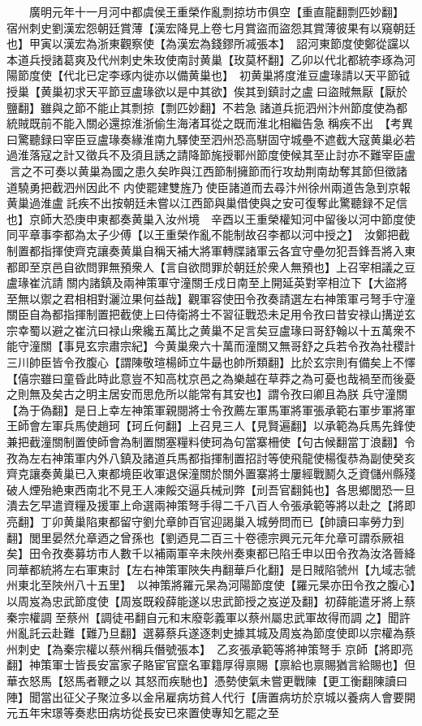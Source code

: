 　　廣明元年十一月河中都虞侯王重榮作亂剽掠坊市俱空【重直龍翻剽匹妙翻】　宿州刺史劉漢宏怨朝廷賞薄【漢宏降見上卷七月賞盜而盜怨其賞薄彼果有以窺朝廷也】甲寅以漢宏為浙東觀察使【為漢宏為錢鏐所㓕張本】　詔河東節度使鄭從讜以本道兵授諸葛爽及代州刺史朱玫使南討黄巢【玫莫杯翻】乙卯以代北都統李琢為河陽節度使【代北已定李琢内徙亦以備黄巢也】　初黄巢將度淮豆盧瑑請以天平節钺授巢【黄巢初求天平節豆盧瑑欲以是中其欲】俟其到鎮討之盧曰盜賊無厭【厭於鹽翻】雖與之節不能止其剽掠【剽匹妙翻】不若急諸道兵扼泗州汴州節度使為都統賊既前不能入關必還掠淮浙偷生海渚耳從之既而淮北相繼告急稱疾不出　【考異曰驚聽録曰宰臣豆盧瑑奏緣淮南九驛使至泗州恐高駢固守城壘不遮截大寇黄巢必若過淮落寇之計又徵兵不及須且誘之請降節旄授鄆州節度使候其至止討亦不難宰臣盧言之不可奏以黄巢為國之患久矣昨與江西節制擁節而行攻劫荆南劫奪其節但徵諸道驍勇把截泗州因此不内使罷建雙旌乃使臣諸道而去尋汴州徐州兩道告急到京報黄巢過淮盧託疾不出按朝廷未嘗以江西節與巢借使與之安可復奪此驚聽録不足信也】京師大恐庚申東都奏黄巢入汝州境　辛酉以王重榮權知河中留後以河中節度使同平章事李都為太子少傅【以王重榮作亂不能制故召李都以河中授之】　汝鄭把截制置都指揮使齊克讓奏黄巢自稱天補大將軍轉牒諸軍云各宜守壘勿犯吾鋒吾將入東都即至京邑自欲問罪無預衆人【言自欲問罪於朝廷於衆人無預也】上召宰相議之豆盧瑑崔沆請關内諸鎮及兩神策軍守潼關壬戍日南至上開延英對宰相泣下【大盜將至無以禦之君相相對灑泣果何益哉】觀軍容使田令孜奏請選左右神策軍弓弩手守潼關臣自為都指揮制置把截使上曰侍衛將士不習征戰恐未足用令孜曰昔安禄山搆逆玄宗幸蜀以避之崔沆曰禄山衆纔五萬比之黄巢不足言矣豆盧瑑曰哥舒翰以十五萬衆不能守潼關【事見玄宗肅宗紀】今黄巢衆六十萬而潼關又無哥舒之兵若令孜為社稷計三川帥臣皆令孜腹心【謂陳敬瑄楊師立牛朂也帥所類翻】比於玄宗則有備矣上不懌【僖宗雖曰童昏此時此意豈不知高枕京邑之為樂越在草莽之為可憂也哉禍至而後憂之則無及矣古之明主居安而思危所以能常有其安也】謂令孜曰卿且為朕兵守潼關【為于偽翻】是日上幸左神策軍親閱將士令孜薦左軍馬軍將軍張承範右軍步軍將軍王師會左軍兵馬使趙珂【珂丘何翻】上召見三人【見賢遍翻】以承範為兵馬先鋒使兼把截潼關制置使師會為制置關塞糧料使珂為句當寨柵使【句古候翻當丁浪翻】令孜為左右神策軍内外八鎮及諸道兵馬都指揮制置招討等使飛龍使楊復恭為副使癸亥齊克讓奏黄巢已入東都境臣收軍退保潼關於關外置寨將士屢經戰鬭久乏資儲州縣殘破人煙殆絶東西南北不見王人凍餒交逼兵械刓弊【刓吾官翻鈍也】各思鄉閭恐一旦潰去乞早遣資糧及援軍上命選兩神策弩手得二千八百人令張承範等將以赴之【將即亮翻】丁卯黄巢陷東都留守劉允章帥百官迎謁巢入城勞問而已【帥讀曰率勞力到翻】閭里晏然允章迺之曾孫也【劉迺見二百三十卷德宗興元元年允章可謂忝厥祖矣】田令孜奏募坊市人數千以補兩軍辛未陜州奏東都已陷壬申以田令孜為汝洛晉絳同華都統將左右軍東討【左右神策軍陜失冉翻華戶化翻】是日賊陷虢州【九域志虢州東北至陜州八十五里】　以神策將羅元杲為河陽節度使【羅元杲亦田令孜之腹心】　以周岌為忠武節度使【周岌既殺薛能遂以忠武節授之岌逆及翻】初薛能遣牙將上蔡秦宗權調至蔡州【調徒弔翻自元和末廢彰義軍以蔡州屬忠武軍故得而調之】聞許州亂託云赴難【難乃旦翻】選募蔡兵遂逐刺史據其城及周岌為節度使即以宗權為蔡州刺史【為秦宗權以蔡州稱兵僭號張本】　乙亥張承範等將神策弩手京師【將即亮翻】神策軍士皆長安富家子賂宦官竄名軍籍厚得禀賜【禀給也禀賜猶言給賜也】但華衣怒馬【怒馬者鞭之以其怒而疾馳也】憑勢使氣未嘗更戰陳【更工衡翻陳讀曰陣】聞當出征父子聚泣多以金帛雇病坊貧人代行【唐置病坊於京城以養病人會要開元五年宋璟等奏悲田病坊從長安已來置使專知乞罷之至